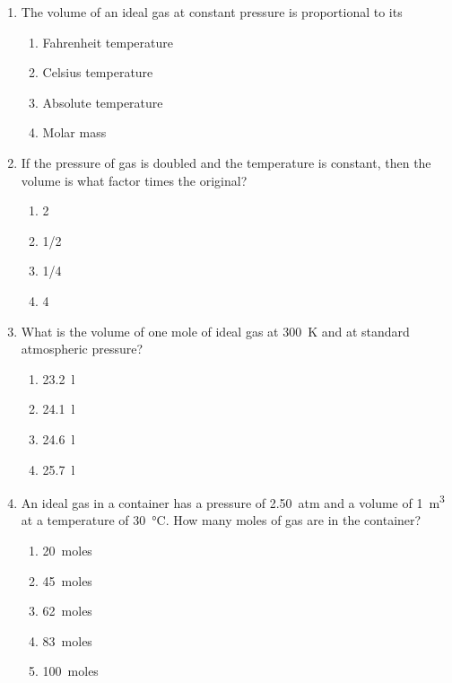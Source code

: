 \documentclass{../../oss-apphys}
\begin{document}
\begin{multicols}{2}
\begin{enumerate}[leftmargin=18pt,start=24]
  \item The volume of an ideal gas at constant pressure is proportional to its
    \begin{enumerate}[noitemsep,topsep=0pt,leftmargin=18pt,label=(\Alph*)]
    \item Fahrenheit temperature
    \item Celsius temperature
    \item Absolute temperature
    \item Molar mass
    \end{enumerate}

  \item If the pressure of gas is doubled and the temperature is constant, then
    the volume is what factor times the original?
    \begin{enumerate}[noitemsep,topsep=0pt,leftmargin=18pt,label=(\Alph*)]
    \item 2
    \item 1/2
    \item 1/4
    \item 4
    \end{enumerate}

    \columnbreak
    
  \item What is the volume of one mole of ideal gas at \SI{300}{K} and at
    standard atmospheric pressure?
    \begin{enumerate}[noitemsep,topsep=0pt,leftmargin=18pt,label=(\Alph*)]
    \item\SI{23.2}{\litre}
    \item\SI{24.1}{\litre}
    \item\SI{24.6}{\litre}
    \item\SI{25.7}{\litre}
    \end{enumerate}

  \item An ideal gas in a container has a pressure of \SI{2.50}{atm} and a
    volume of \SI{1}{m^3} at a temperature of \SI{30}{\celsius}. How many moles
    of gas are in the container?
    \begin{enumerate}[noitemsep,topsep=0pt,leftmargin=18pt,label=(\Alph*)]
    \item\SI{20}{moles}
    \item\SI{45}{moles}
    \item\SI{62}{moles}
    \item\SI{83}{moles}
    \item\SI{100}{moles}
    \end{enumerate}

  \end{enumerate}
\end{multicols}
\end{document}
